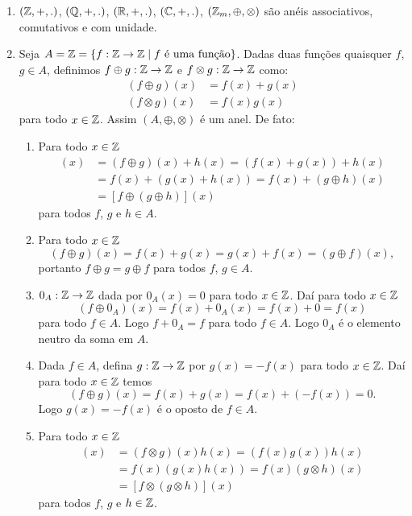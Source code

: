\begin{exemplos}
	\begin{enumerate}[label={\arabic*})]
		\item $(\mathbb{Z},+,.)$, $(\mathbb{Q},+,.)$, $(\mathbb{R},+,.)$, $(\mathbb{C},+,.)$, $(\mathbb{Z}_m, \oplus, \otimes)$ s{\~a}o an{\'e}is associativos, comutativos e com unidade.

		\item  Seja $A = \z =\{f : \z \to \z \mid f \mbox{ {\'e} uma fun{\c c}{\~a}o}\}$. Dadas duas fun{\c c}{\~o}es quaisquer $f$, $g \in A$, definimos $f\oplus g:\mathbb{Z} \to \mathbb{Z}$ e $f \otimes g:\mathbb{Z} \to \mathbb{Z}$ como:
		\begin{align*}
			(f\oplus g)(x) &= f(x) + g(x)\\
			(f\otimes g)(x) &= f(x)g(x)
		\end{align*}
		para todo $x \in \mathbb{Z}$. Assim $(A, \oplus, \otimes)$ é um anel. De fato:
		\begin{enumerate}[label={\roman*})]
			\item Para todo $x \in \mathbb{Z}$
			\begin{align*}
				[(f \oplus g) \oplus h](x) &= (f \oplus g)(x) + h(x) = (f(x) + g(x)) + h(x)\\ 
				&= f(x) + (g(x) + h(x)) = f(x) + (g \oplus h)(x)\\ &= [f \oplus (g \oplus h)](x)
			\end{align*}
			para todos $f$, $g$ e $h \in A$.
			
			\item Para todo $x \in \mathbb{Z}$
			\[
				(f\oplus g)(x) = f(x) + g(x) = g(x) + f(x) = (g\oplus f)(x),
			\]
			portanto $f\oplus g = g\oplus f$ para todos $f$, $g \in A$.

			\item $0_A : \mathbb{Z} \to \mathbb{Z}$ dada por $0_A(x) = 0$ para todo $x \in \mathbb{Z}$. Daí para todo $x \in \mathbb{Z}$
			\[
				(f \oplus 0_A)(x) = f(x) + 0_A(x) = f(x) + 0 = f(x)
			\]
			para todo $f \in A$. Logo $f + 0_A = f$ para todo $f \in A$. Logo $0_A$ é o elemento neutro da soma em $A$.

			\item Dada $f \in A$, defina $g : \mathbb{Z} \to \mathbb{Z}$ por $g(x) = -f(x)$ para todo $x \in \mathbb{Z}$. Daí para todo $x \in \mathbb{Z}$ temos
			\[
				(f \oplus g)(x) = f(x) + g(x) = f(x) + (-f(x)) = 0.
			\]
			Logo $g(x) = -f(x)$ é o oposto de $f \in A$.

			\item Para todo $x \in \mathbb{Z}$
			\begin{align*}
				[(f \otimes g)\otimes h](x) &= (f \otimes g)(x)h(x) = (f(x)g(x))h(x)\\ &= f(x)(g(x)h(x)) = f(x)(g \otimes h)(x)\\ &= [f\otimes (g \otimes h)](x)
			\end{align*}
			para todos $f$, $g$ e $h \in \mathbb{Z}$.


\end{enumerate}
\end{enumerate}
\end{exemplos}
